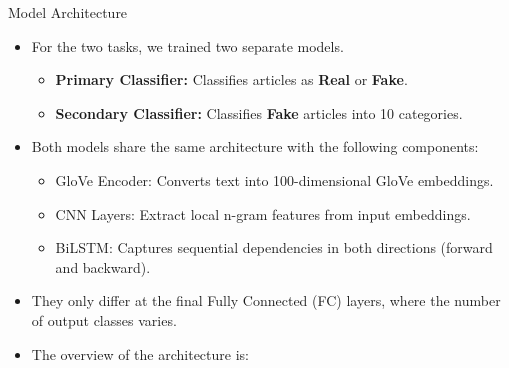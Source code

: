 \documentclass{beamer}
\begin{document}
\begin{frame}{Model Architecture}
    \begin{itemize}
        
        \item For the two tasks, we trained two separate models.
        \begin{itemize}
            \item \textbf{\textcolor{structure}{Primary Classifier}:} Classifies articles as \textbf{Real} or \textbf{Fake}.
            \item \textbf{\textcolor{structure}{Secondary Classifier}:} Classifies \textbf{Fake} articles into 10 categories.
        \end{itemize}

        \item Both models share the same architecture with the following components:
        \begin{itemize}
            \item \textcolor{structure}{GloVe Encoder:} Converts text into 100-dimensional GloVe embeddings.
            \item \textcolor{structure}{CNN Layers:} Extract local n-gram features from input embeddings.
            \item \textcolor{structure}{BiLSTM:} Captures sequential dependencies in both directions (forward and backward).
        \end{itemize}
        
        \item They only differ at the final Fully Connected (FC) layers, where the number of output classes varies.
        
        \item The overview of the architecture is:
        \vspace{0.5cm}

        \begin{center}
        \begin{tikzpicture}[
            box/.style={
                rectangle,
                draw=black,
                minimum height=1cm,
                minimum width=1.2cm,
                align=center,
                font=\scriptsize
            },
            arrow/.style={->, thick}
        ]


\end{tikzpicture}
\end{center}
\end{itemize}
\end{frame}
\end{document}
